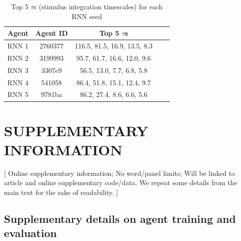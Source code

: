 \documentclass[5p,twocolumn,authoryear]{elsarticle}
\begin{document}

\begin{table}[h!]
    \centering
    \begin{tabular}{ccccc}
     \hline\hline
     \textbf{Agent} & \textbf{Agent ID} & \textbf{Top 5 $\tau$s}  \\
     \hline   
        RNN 1 & 2760377 & 116.5, 81.5, 16.9, 13.5, 8.3  \\ \hline
        RNN 2 & 3199993 & 95.7, 61.7, 16.6, 12.0, 9.6  \\ \hline  
        RNN 3 & 3307e9 & 56.5, 13.0, 7.7, 6.8, 5.8  \\ \hline
        RNN 4 & 541058 & 86.4, 51.8, 15.1, 12.4, 9.7  \\ \hline
        RNN 5 & 9781ba & 86.2, 27.4, 8.6, 6.6, 5.6  \\ \hline
     \hline
    \end{tabular}
    \caption{Top 5 $\tau$s (stimulus integration timescales) for each RNN seed}
\label{table_supp_taus}
\end{table}



\clearpage
\section{SUPPLEMENTARY INFORMATION} 

[
Online supplementary information; 
No word/panel limits; 
Will be linked to article and online supplementary code/data. 
We repeat some details from the main text for the sake of readability.
]

\subsection{Supplementary details on agent training and evaluation}
\label{sec_supp_train_eval}
\end{document}
